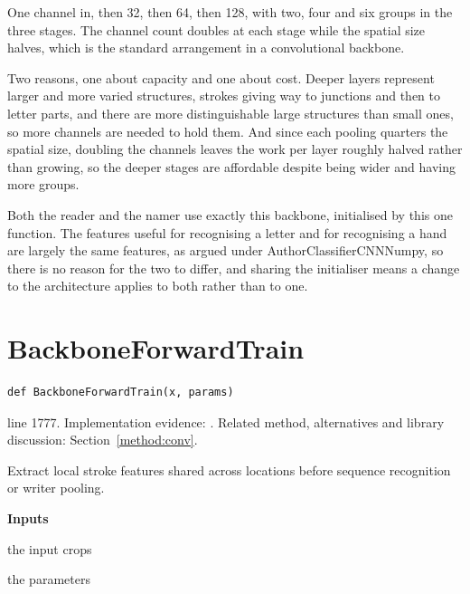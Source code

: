 One channel in, then 32, then 64, then 128, with two, four and six groups in the three stages. The channel count doubles at each stage while the spatial size halves, which is the standard arrangement in a convolutional backbone.


Two reasons, one about capacity and one about cost. Deeper layers represent larger and more varied structures, strokes giving way to junctions and then to letter parts, and there are more distinguishable large structures than small ones, so more channels are needed to hold them. And since each pooling quarters the spatial size, doubling the channels leaves the work per layer roughly halved rather than growing, so the deeper stages are affordable despite being wider and having more groups.


Both the reader and the namer use exactly this backbone, initialised by this one function. The features useful for recognising a letter and for recognising a hand are largely the same features, as argued under AuthorClassifierCNNNumpy, so there is no reason for the two to differ, and sharing the initialiser means a change to the architecture applies to both rather than to one.



\section{BackboneForwardTrain}\label{fn:train:BackboneForwardTrain}
\begin{lstlisting}[style=sig]
def BackboneForwardTrain(x, params)
\end{lstlisting}
 line 1777. Implementation evidence: \cite{code2026}. Related method, alternatives and library discussion: Section~\ref{method:conv}.


Extract local stroke features shared across locations before sequence recognition or writer pooling.




\noindent\textbf{Inputs}
\begin{description}[leftmargin=2.2em,style=nextline,font=\normalfont\ttfamily]\setlength\itemsep{1pt}
  \item[{x}] \normalfont the input crops
  \item[{params}] \normalfont the parameters
\end{description}


